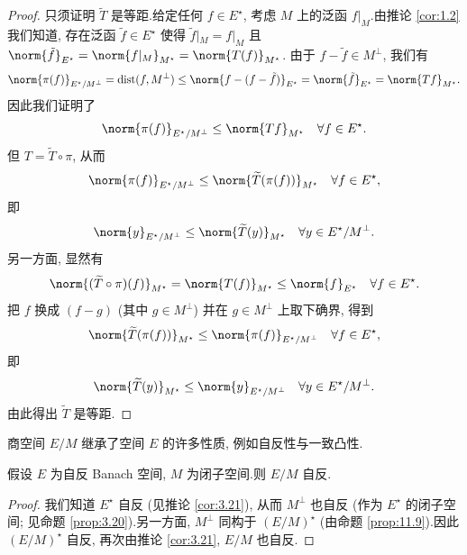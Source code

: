 \begin{proof}
只须证明 $\widetilde T$ 是等距.给定任何 $f\in E^\star$, 考虑 $M$ 上的泛函
$f|_M$.由推论  \ref{cor:1.2} 我们知道, 存在泛函 $\tilde f\in E^\star$
使得 $\tilde f|_M=f|_M$ 且
$\norm{\tilde f}_{E^\star}=\norm{f|_M}_{M^\star}=\norm{T(f)}_{M^\star}$.
由于 $f-\tilde f\in M^\perp$, 我们有
\begin{equation*}
\norm{\pi(f)}_{E^\star/M^\perp}=\dist(f,M^\perp)
\le\norm{f-(f-\tilde f)}_{E^\star}=\norm{\tilde f}_{E^\star}
=\norm{Tf}_{M^\star}.
\end{equation*}
因此我们证明了
\begin{equation*}
\norm{\pi(f)}_{E^\star/M^\perp}\le\norm{Tf}_{M^\star}\quad\forall f\in E^\star.
\end{equation*}
但 $T=\widetilde T\circ\pi$, 从而
\begin{equation*}
\norm{\pi(f)}_{E^\star/M^\perp}\le\norm{\widetilde T(\pi(f))}_{M^\star}
\quad\forall f\in E^\star,
\end{equation*}
即
\begin{equation*}
\norm{y}_{E^\star/M^\perp}\le\norm{\widetilde T(y)}_{M^\star}
\quad\forall y\in E^\star/M^\perp.
\end{equation*}
另一方面, 显然有
\begin{equation*}
\norm{(\widetilde T\circ\pi)(f)}_{M^\star}=\norm{T(f)}_{M^\star}\le\norm{f}_{E^\star}
\quad\forall f\in E^\star.
\end{equation*}
把 $f$ 换成 $(f-g)$ (其中 $g\in M^\perp$) 并在 $g\in M^\perp$ 上取下确界,
得到
\begin{equation*}
\norm{\widetilde T(\pi(f))}_{M^\star}\le\norm{\pi(f)}_{E^\star/M^\perp}
\quad\forall f\in E^\star,
\end{equation*}
即
\begin{equation*}
\norm{\widetilde T(y)}_{M^\star}\le\norm{y}_{E^\star/M^\perp}
\quad\forall y\in E^\star/M^\perp.
\end{equation*}
由此得出 $\widetilde T$ 是等距.
\end{proof}

商空间 $E/M$ 继承了空间 $E$ 的许多性质, 例如自反性与一致凸性.

\begin{proposition}
\label{prop:11.11}
假设 $E$ 为自反 Banach 空间, $M$ 为闭子空间.则 $E/M$ 自反.
\end{proposition}

\begin{proof}
我们知道 $E^\star$ 自反 (见推论  \ref{cor:3.21}), 从而 $M^\perp$ 也自反
(作为 $E^\star$ 的闭子空间; 见命题  \ref{prop:3.20}).另一方面, $M^\perp$
同构于 $(E/M)^\star$ (由命题  \ref{prop:11.9}).因此 $(E/M)^\star$ 自反,
再次由推论  \ref{cor:3.21}, $E/M$ 也自反.
\end{proof}


